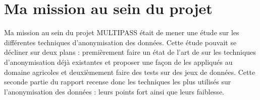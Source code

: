  \section{Ma mission au sein du projet} 

Ma mission au sein du projet MULTIPASS était de mener une étude sur les différentes techniques d’anonymisation des données. Cette étude pouvait se décliner sur deux plans : premièrement faire un état de l’art de sur les techniques d’anonymisation déjà existantes et proposer une façon de les appliqués au domaine agricoles et deuxièmement faire des tests sur des jeux de données. Cette seconde partie du rapport recense donc les techniques les plus utilisés sur l’anonymisation des données : leurs points fort ainsi que leurs faiblesse. 